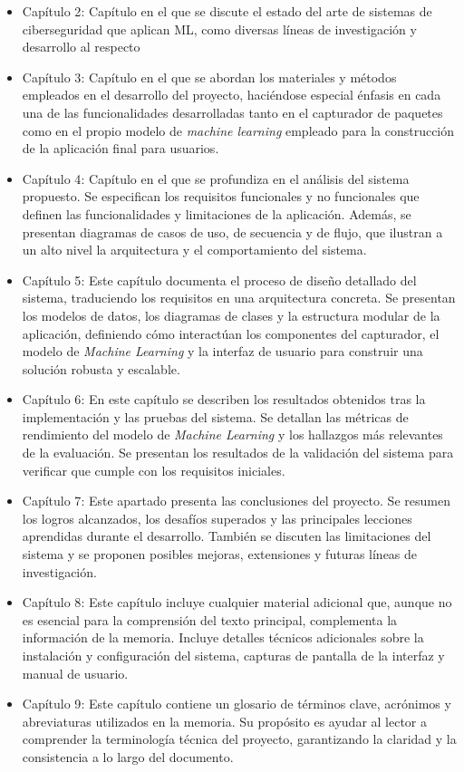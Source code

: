 \begin{itemize}
    \item{Capítulo 2}: Capítulo en el que se discute el estado del arte de sistemas de ciberseguridad que aplican ML, como diversas líneas de investigación y desarrollo al respecto
    \item{Capítulo 3}: Capítulo en el que se abordan los materiales y métodos empleados en el desarrollo del proyecto, haciéndose especial énfasis en cada una de las funcionalidades desarrolladas tanto en el capturador de paquetes como en el propio modelo de \textit{machine learning} empleado para la construcción de la aplicación final para usuarios.
    \item{Capítulo 4}: Capítulo en el que se profundiza en el análisis del sistema propuesto. Se especifican los requisitos funcionales y no funcionales que definen las funcionalidades y limitaciones de la aplicación. Además, se presentan diagramas de casos de uso, de secuencia y de flujo, que ilustran a un alto nivel la arquitectura y el comportamiento del sistema.
    \item{Capítulo 5}: Este capítulo documenta el proceso de diseño detallado del sistema, traduciendo los requisitos en una arquitectura concreta. Se presentan los modelos de datos, los diagramas de clases y la estructura modular de la aplicación, definiendo cómo interactúan los componentes del capturador, el modelo de \textit{Machine Learning} y la interfaz de usuario para construir una solución robusta y escalable.
    \item{Capítulo 6}: En este capítulo se describen los resultados obtenidos tras la implementación y las pruebas del sistema. Se detallan las métricas de rendimiento del modelo de \textit{Machine Learning} y los hallazgos más relevantes de la evaluación. Se presentan los resultados de la validación del sistema para verificar que cumple con los requisitos iniciales.
    \item{Capítulo 7}: Este apartado presenta las conclusiones del proyecto. Se resumen los logros alcanzados, los desafíos superados y las principales lecciones aprendidas durante el desarrollo. También se discuten las limitaciones del sistema y se proponen posibles mejoras, extensiones y futuras líneas de investigación.
    \item{Capítulo 8}: Este capítulo incluye cualquier material adicional que, aunque no es esencial para la comprensión del texto principal, complementa la información de la memoria. Incluye detalles técnicos adicionales sobre la instalación y configuración del sistema, capturas de pantalla de la interfaz y manual de usuario.
    \item{Capítulo 9}: Este capítulo contiene un glosario de términos clave, acrónimos y abreviaturas utilizados en la memoria. Su propósito es ayudar al lector a comprender la terminología técnica del proyecto, garantizando la claridad y la consistencia a lo largo del documento.
    
\end{itemize}